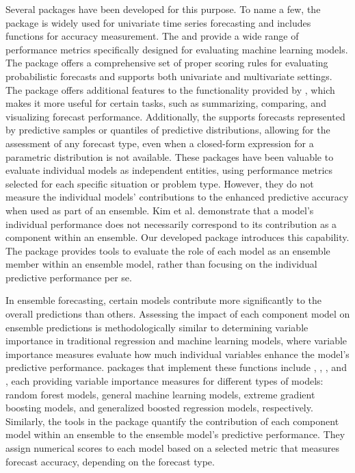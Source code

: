 \documentclass[
  article,
  shortnames,
  notitle]{jss}
\begin{document}
Several  packages have been developed for this purpose. To
name a few, the  package \citep{Rpackage-forecast} is
widely used for univariate time series forecasting and includes
functions for accuracy measurement. The 
\citep{Rpackage-Metrics} and  \citep{Rpackage-MLmetrics}
provide a wide range of performance metrics specifically designed for
evaluating machine learning models. The 
\citep{Rpackage-scoringRules} package offers a comprehensive set of
proper scoring rules for evaluating probabilistic forecasts and supports
both univariate and multivariate settings. The 
\citep{bosse2022evaluating} package offers additional features to the
functionality provided by , which makes it more useful
for certain tasks, such as summarizing, comparing, and visualizing
forecast performance. Additionally, the  supports
forecasts represented by predictive samples or quantiles of predictive
distributions, allowing for the assessment of any forecast type, even
when a closed-form expression for a parametric distribution is not
available. These packages have been valuable to evaluate individual
models as independent entities, using performance metrics selected for
each specific situation or problem type. However, they do not measure
the individual models' contributions to the enhanced predictive accuracy
when used as part of an ensemble. Kim et al. \citep{kim2024} demonstrate
that a model's individual performance does not necessarily correspond to
its contribution as a component within an ensemble. Our developed
package introduces this capability. The  package
provides tools to evaluate the role of each model as an ensemble member
within an ensemble model, rather than focusing on the individual
predictive performance per se.

In ensemble forecasting, certain models contribute more significantly to
the overall predictions than others. Assessing the impact of each
component model on ensemble predictions is methodologically similar to
determining variable importance in traditional regression and machine
learning models, where variable importance measures evaluate how much
individual variables enhance the model's predictive performance.
 packages that implement these functions include
 \citep{Rpackage-randomForest}, 
\citep{Rpackage-caret},  \citep{Rpackage-xgboost}, and
 \citep{Rpackage-gbm}, each providing variable importance
measures for different types of models: random forest models, general
machine learning models, extreme gradient boosting models, and
generalized boosted regression models, respectively. Similarly, the
tools in the  package quantify the contribution of
each component model within an ensemble to the ensemble model's
predictive performance. They assign numerical scores to each model based
on a selected metric that measures forecast accuracy, depending on the
forecast type.
\end{document}

